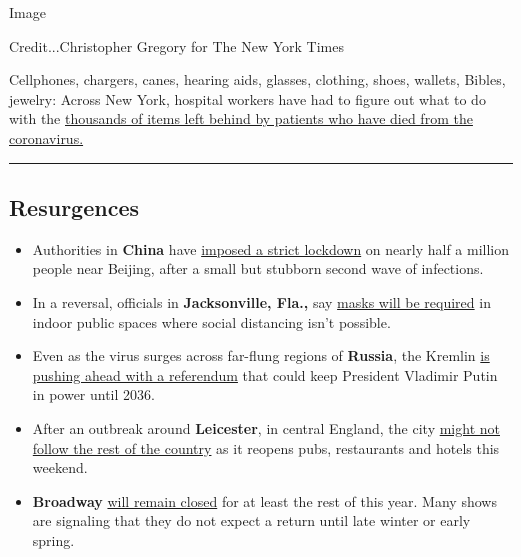 Image

Credit...Christopher Gregory for The New York Times

Cellphones, chargers, canes, hearing aids, glasses, clothing, shoes,
wallets, Bibles, jewelry: Across New York, hospital workers have had to
figure out what to do with the
\href{https://www.nytimes3xbfgragh.onion/2020/06/29/nyregion/coronavirus-hospitals-patients-belongings.html}{thousands
of items left behind by patients who have died from the coronavirus.}

\begin{center}\rule{0.5\linewidth}{\linethickness}\end{center}

\hypertarget{resurgences}{%
\subsection{Resurgences}\label{resurgences}}

\begin{itemize}
\item
  Authorities in \textbf{China} have
  \href{https://www.nytimes3xbfgragh.onion/2020/06/29/world/coronavirus-updates.html\#link-4f49ac1}{imposed
  a strict lockdown} on nearly half a million people near Beijing, after
  a small but stubborn second wave of infections.
\item
  In a reversal, officials in \textbf{Jacksonville, Fla.,} say
  \href{https://www.nytimes3xbfgragh.onion/2020/06/29/world/coronavirus-live-updates.html\#link-102ec095}{masks
  will be required} in indoor public spaces where social distancing
  isn't possible.
\item
  Even as the virus surges across far-flung regions of \textbf{Russia},
  the Kremlin
  \href{https://www.nytimes3xbfgragh.onion/2020/06/29/world/europe/coronavirus-russia-putin-referendum.html}{is
  pushing ahead with a referendum} that could keep President Vladimir
  Putin in power until 2036.
\item
  After an outbreak around \textbf{Leicester}, in central England, the
  city
  \href{https://www.nytimes3xbfgragh.onion/2020/06/29/world/coronavirus-updates.html\#link-4f49ac1}{might
  not follow the rest of the country} as it reopens pubs, restaurants
  and hotels this weekend.
\item
  \textbf{Broadway}
  \href{https://www.nytimes3xbfgragh.onion/2020/06/29/world/coronavirus-live-updates.html\#link-27ecd755}{will
  remain closed} for at least the rest of this year. Many shows are
  signaling that they do not expect a return until late winter or early
  spring.
\end{itemize}

